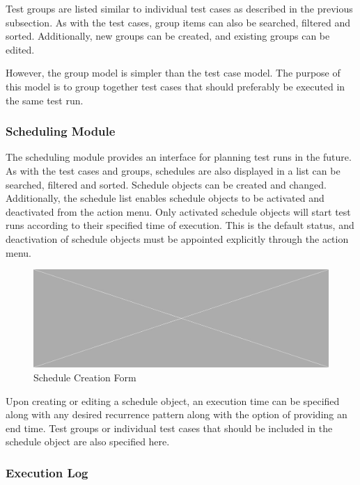 Test groups are listed similar to individual test cases as described in the previous subsection. As with the test cases, group items can also be searched, filtered and sorted. Additionally, new groups can be created, and existing groups can be edited.

However, the group model is simpler than the test case model. The purpose of this model is to group together test cases that should preferably be executed in the same test run.

\subsubsection{Scheduling Module}

The scheduling module provides an interface for planning test runs in the future. As with the test cases and groups, schedules are also displayed in a list can be searched, filtered and sorted. Schedule objects can be created and changed. Additionally, the schedule list enables schedule objects to be activated and deactivated from the action menu. Only activated schedule objects will start test runs according to their specified time of execution. This is the default status, and deactivation of schedule objects must be appointed explicitly through the action menu.

\begin{figure}[h]
    \centering
    \includegraphics[width=\textwidth]{figures/placeholder.png}
    \caption{Schedule Creation Form}
    \label{fig.sched_mod}
\end{figure}

Upon creating or editing a schedule object, an execution time can be specified along with any desired recurrence pattern along with the option of providing an end time. Test groups or individual test cases that should be included in the schedule object are also specified here.

\subsubsection{Execution Log}

